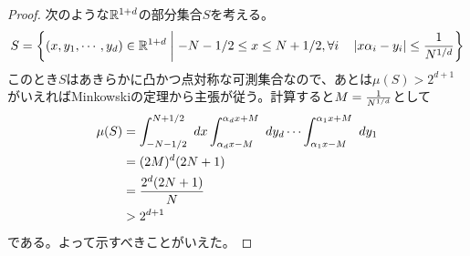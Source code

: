 \documentclass[10pt]{jsarticle}%
\begin{document}
\begin{proof}
次のような${\mathbb R}^{1+d}$の部分集合$S$を考える。
\[
S = \left\{ (x,y_1, \cdots , y_d) \in {\mathbb R}^{1+d} \mathrel{} \middle| \mathrel{}    -N-1/2 \leq x \leq N + 1/2, \forall i \quad  \left \lvert x {\alpha}_i - y_i \right \rvert \leq \frac{1}{N^{1/d}}  \right\}
\]
このとき$S$はあきらかに凸かつ点対称な可測集合なので、あとは$\mu(S) > 2^{d+1}$がいえればMinkowskiの定理から主張が従う。計算すると$M = \frac{1}{N^{1/d}}$として
\begin{align*}
\mu(S) &= \int_{-N-1/2}^{N+1/2} \ dx \int_{{\alpha}_d x - M}^{{\alpha}_d x + M} \ dy_d \cdots \int_{{\alpha}_1 x - M}^{{\alpha}_1 x + M} \ dy_1 \\
&= (2M)^d (2N+1) \\
&= \frac{2^d (2N+1)}{N} \\
&> 2^{d+1}
\end{align*}
である。よって示すべきことがいえた。
\end{proof}

\end{document}
